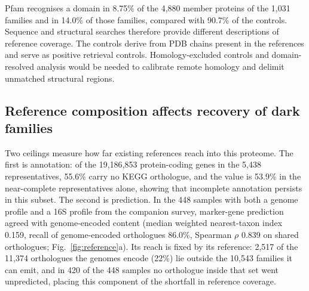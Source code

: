 \documentclass[11pt]{article}
\begin{document}
Pfam recognises a domain in 8.75\% of the 4{,}880 member proteins of the 1{,}031 families and
in 14.0\% of those families, compared with 90.7\% of the controls. Sequence and structural
searches therefore provide different descriptions of reference coverage. The controls derive
from PDB chains present in the references and serve as positive retrieval controls. Homology-excluded
controls and domain-resolved analysis would be needed to calibrate remote homology and delimit
unmatched structural regions.

\subsection*{Reference composition affects recovery of dark families}

Two ceilings measure how far existing references reach into this proteome. The first is
annotation: of the 19{,}186{,}853 protein-coding genes in the 5{,}438 representatives, 55.6\% carry
no KEGG orthologue, and the value is 53.9\% in the near-complete representatives alone, showing that incomplete annotation persists in this subset. The second is prediction. In the 448
samples with both a genome profile and a 16S profile from the companion survey, marker-gene
prediction agreed with genome-encoded content (median weighted nearest-taxon index 0.159, recall of
genome-encoded orthologues 86.0\%, Spearman $\rho$ 0.839 on shared orthologues;
Fig.~\ref{fig:reference}a). Its reach is fixed by its reference: 2{,}517 of the 11{,}374
orthologues the genomes encode (22\%) lie outside the 10{,}543 families it can emit, and in 420 of
the 448 samples no orthologue inside that set went unpredicted, placing this component of the shortfall in reference coverage.
\end{document}
